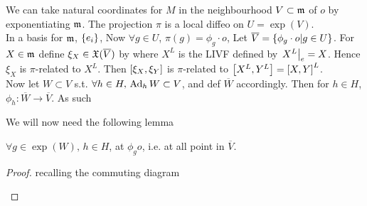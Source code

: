 \documentclass{article}
\begin{document}
We can take natural coordinates for $M$ in the neighbourhood $V\subset \mf{m}$ of $o$ by exponentiating $\mf{m}$. The projection $\pi$ is a local diffeo on $U = \exp(V)$. \\
In a basis for $\mf{m}$, $\pbrace{e_i}$,  
Now $\forall g \in U$, $\pi(g) = \phi_g \cdot o $, Let $\overline{V} = \pbrace{\phi_g \cdot o | g \in U}$. For $X \in \mf{m}$ define $\xi_X \in \mf{X}(\overline{V})$ by 
where $X^L$ is the LIVF defined by $\ev{X^L}{e} = X$. Hence $\xi_X$ is $\pi$-related to $X^L$. Then $\comm[\xi_X]{\xi_Y}$ is $\pi$-related to $\comm[X^L]{Y^L} = \comm[X]{Y}^L$. \\  
Now let $W\subset V$ s.t. $\forall h \in H , \, \Ad_hW \subset V$, and def $\overline{W}$ accordingly. Then for $h\in H$, $\phi_h : \overline{W} \to \overline{V}$. As such 

We will now need the following lemma 

\begin{lemma}
$\forall g \in \exp(W), \, h \in H$, 
at $\phi_g o $, i.e. at all point in $\overline{V}$. 
\end{lemma}
\begin{proof}
recalling the commuting diagram 
\begin{center}
\end{center}
\end{proof}
\end{document}
